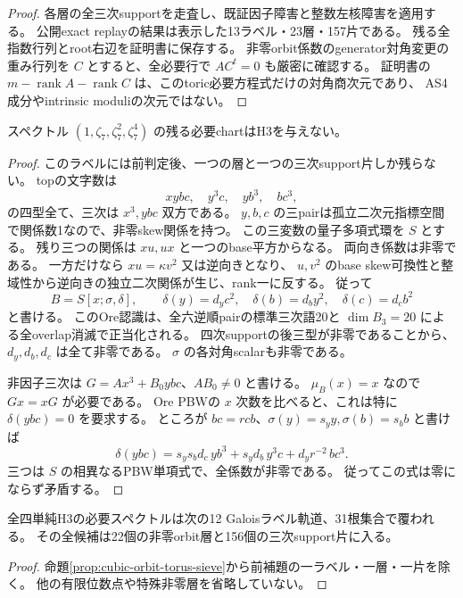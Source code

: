 \begin{proof}
各層の全三次supportを走査し、既証因子障害と整数左核障害を適用する。
公開exact replayの結果は表示した13ラベル・23層・157片である。
残る全指数行列とroot右辺を証明書に保存する。
非零orbit係数のgenerator対角変更の重み行列を $C$ とすると、全必要行で $AC^t=0$ も厳密に確認する。
証明書の $m-\operatorname{rank}A-\operatorname{rank}C$ は、このtoric必要方程式だけの対角商次元であり、
AS4成分やintrinsic moduliの次元ではない。
\end{proof}

\begin{lemma}
\label{lem:cubic-order7-volume-Ore-empty}
スペクトル $(1,\zeta_7,\zeta_7^2,\zeta_7^4)$ の残る必要chartはH3を与えない。
\end{lemma}
\begin{proof}
このラベルには前判定後、一つの層と一つの三次support片しか残らない。
topの文字数は
\[
 xybc,\quad y^3c,\quad yb^3,\quad bc^3,
\]
の四型全て、三次は $x^3,ybc$ 双方である。
$y,b,c$ の三pairは孤立二次元指標空間で関係数1なので、非零skew関係を持つ。
この三変数の量子多項式環を $S$ とする。
残り三つの関係は $xu,ux$ と一つのbase平方からなる。
両向き係数は非零である。
一方だけなら $xu=\kappa v^2$ 又は逆向きとなり、
$u,v^2$ のbase skew可換性と整域性から逆向きの独立二次関係が生じ、rank一に反する。
従って
\[
 B=S[x;\sigma,\delta],\qquad
 \delta(y)=d_yc^2,\quad\delta(b)=d_by^2,\quad\delta(c)=d_cb^2
\]
と書ける。
このOre認識は、全六逆順pairの標準三次語20と $\dim B_3=20$ による全overlap消滅で正当化される。
四次supportの後三型が非零であることから、$d_y,d_b,d_c$ は全て非零である。
$\sigma$ の各対角scalarも非零である。

非因子三次は $G=Ax^3+B_0ybc$、$AB_0\ne0$ と書ける。
$\mu_B(x)=x$ なので $Gx=xG$ が必要である。
Ore PBWの $x$ 次数を比べると、これは特に $\delta(ybc)=0$ を要求する。
ところが $bc=r cb$、$\sigma(y)=s_y y,\sigma(b)=s_b b$ と書けば
\[
 \delta(ybc)=s_ys_bd_c\,yb^3+s_yd_b\,y^3c+d_yr^{-2}\,bc^3.
\]
三つは $S$ の相異なるPBW単項式で、全係数が非零である。
従ってこの式は零にならず矛盾する。
\end{proof}

\begin{theorem}[12有限ラベルによる全必要被覆]
\label{thm:cubic-four-simple-twelve-orbit-torus}
全四単純H3の必要スペクトルは次の12 Galoisラベル軌道、31根集合で覆われる。
その全候補は22個の非零orbit層と156個の三次support片に入る。
\end{theorem}
\begin{proof}
命題\ref{prop:cubic-orbit-torus-sieve}から前補題の一ラベル・一層・一片を除く。
他の有限位数点や特殊非零層を省略していない。
\end{proof}

